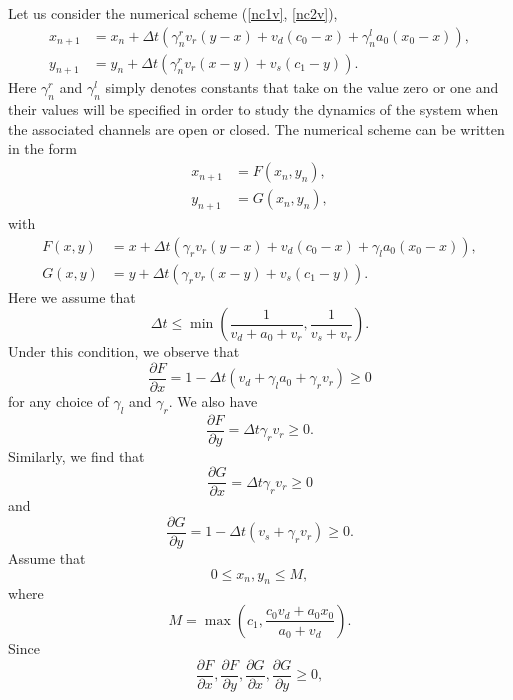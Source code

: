 Let us consider the numerical scheme (\ref{nc1v}, \ref{nc2v}), 
\begin{align}
x_{n+1}  &  =x_n+\Delta t\left( \gamma_n^{r}v_{r}\left(  y-x\right)  +v_{d}\left(
c_{0}-x\right)  +\gamma_n^{l}a_{0}(x_{0}-x)\right) ,\label{x400}\\
y_{n+1} &  =y_n+\Delta t\left(\gamma_n^{r}v_{r}\left(  x-y\right)  +v_{s}\left(
c_{1}-y\right) \right)  . \label{y400}%
\end{align}
Here $\gamma_n^{r}$ and $\gamma_n^{l}$ simply denotes constants that take on the
value zero or one and their values will be specified in order to study the
dynamics of the system when the associated channels are open or closed. The
numerical scheme can be written in the form%
\begin{align}
x_{n+1} &  =F\left(  x_{n},y_{n}\right)  ,\label{x401}\\
y_{n+1} &  =G\left(  x_{n},y_{n}\right)  ,\label{y401}%
\end{align}
with%
\begin{align*}
F(x,y) &  =x+\Delta t\left(  \gamma_{r}v_{r}\left(  y-x\right)  +v_{d}\left(
c_{0}-x\right)  +\gamma_{l}a_{0}(x_{0}-x)\right)  ,\\
G(x,y) &  =y+\Delta t\left(  \gamma_{r}v_{r}\left(  x-y\right)  +v_{s}\left(
c_{1}-y\right)  \right).
\end{align*}
Here we assume that
\begin{equation}
\Delta t\leqslant\min\left(  \frac{1}{v_{d}+a_{0}+v_{r}},\frac{1}{v_{s}+v_{r}%
}\right).  \label{dt400}%
\end{equation}
Under this condition, we observe that%
\[
\frac{\partial F}{\partial x}=1-\Delta t\left(  v_{d}+\gamma_{l}a_{0}%
+\gamma_{r}v_{r}\right)  \geqslant0
\]
for any choice of $\gamma_{l}$ and $\gamma_{r}$. We also have%
\[
\frac{\partial F}{\partial y}=\Delta t \gamma_{r}v_{r}\geqslant0.
\]
Similarly, we find that
\begin{equation}
\frac{\partial G}{\partial x}=\Delta t \gamma_{r}v_{r}\geqslant0
\end{equation}
and%
\begin{equation}
\frac{\partial G}{\partial y}=1-\Delta t\left(  v_{s}+\gamma_{r}v_{r}\right)
\geqslant0.
\end{equation}
Assume that%
\begin{equation}
0\leqslant x_{n},y_{n}\leqslant M,\label{y411}%
\end{equation}
where%
\[
M=\max\left(  c_{1},\frac{c_0 v_d +a_{0}x_{0}}{a_{0}+v_{d}}\right)  .
\]
Since
\[
\frac{\partial F}{\partial x},\frac{\partial F}{\partial y},\frac{\partial
G}{\partial x},\frac{\partial G}{\partial y}\geqslant0,
\]
